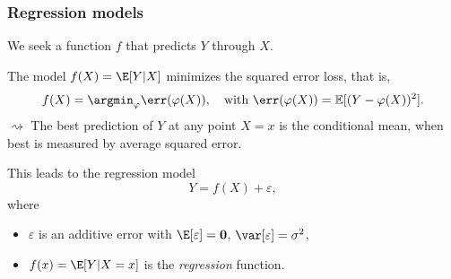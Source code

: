\documentclass{beamer}\usepackage[]{graphicx}\usepackage[]{color}
\begin{document}
\begin{frame}
  \frametitle{Regression models}

  We seek a function $f$ that predicts $Y$ through $X$.

  \begin{proposition} The  model $f(X)=\E[Y|X]$ minimizes  the squared
    error loss, that is,
    \begin{equation*}
      f(X)   =    \argmin_{\varphi}   \err(\varphi(X)),   \quad
      \text{with } \err(\varphi(X)) = \mathbb{E}[(Y - \varphi(X))^2].
    \end{equation*}
    $\rightsquigarrow$ The best prediction of $Y$ at any point $X = x$
    is the conditional mean, when  best is measured by average squared
    error.
  \end{proposition}

  \vfill

  This leads to the regression model
    \begin{equation*}
      Y = f(X) + \varepsilon,
    \end{equation*}
    where
    \begin{itemize}
    \item     $\varepsilon$     is     an    additive     error     with
      $\E[\varepsilon]=\mathbf{0}$, $\var[\varepsilon]=\sigma^2$,
    \item $f(x) = \E[Y | X = x]$ is the \emph{regression} function.
    \end{itemize}

\end{frame}
\end{document}

